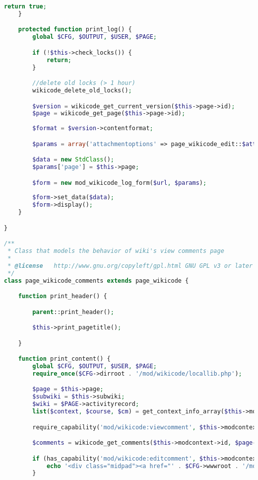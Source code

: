\begin{lstlisting}[language=PHP]
        return true;
    }

    protected function print_log() {
        global $CFG, $OUTPUT, $USER, $PAGE;

        if (!$this->check_locks()) {
            return;
        }

        //delete old locks (> 1 hour)
        wikicode_delete_old_locks();

        $version = wikicode_get_current_version($this->page->id);
		$page = wikicode_get_page($this->page->id);
		
        $format = $version->contentformat;

        $params = array('attachmentoptions' => page_wikicode_edit::$attachmentoptions, 'format' => $version->contentformat, 'version' => $versionnumber, 'pagetitle'=>$this->page->title);

        $data = new StdClass();
		$params['page'] = $this->page;

        $form = new mod_wikicode_log_form($url, $params);
		
        $form->set_data($data);
        $form->display();
    }

}

/**
 * Class that models the behavior of wiki's view comments page
 *
 * @license   http://www.gnu.org/copyleft/gpl.html GNU GPL v3 or later
 */
class page_wikicode_comments extends page_wikicode {

    function print_header() {

        parent::print_header();

        $this->print_pagetitle();

    }

    function print_content() {
        global $CFG, $OUTPUT, $USER, $PAGE;
        require_once($CFG->dirroot . '/mod/wikicode/locallib.php');

        $page = $this->page;
        $subwiki = $this->subwiki;
        $wiki = $PAGE->activityrecord;
        list($context, $course, $cm) = get_context_info_array($this->modcontext->id);

        require_capability('mod/wikicode:viewcomment', $this->modcontext, NULL, true, 'noviewcommentpermission', 'wikicode');

        $comments = wikicode_get_comments($this->modcontext->id, $page->id);

        if (has_capability('mod/wikicode:editcomment', $this->modcontext)) {
            echo '<div class="midpad"><a href="' . $CFG->wwwroot . '/mod/wikicode/editcomments.php?action=add&amp;pageid=' . $page->id . '">' . get_string('addcomment', 'wikicode') . '</a></div>';
        }


\end{lstlisting}
